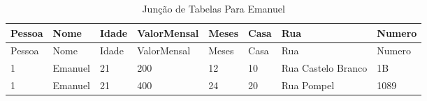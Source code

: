 \begin{longtable}[]{@{}llllllll@{}}
\caption{Junção de Tabelas Para Emanuel \label{tab: juncao-de-tabelas-para-emanuel}}\tabularnewline
\toprule
\footnotesize{Pessoa} & \footnotesize{Nome} & \footnotesize{Idade} & \footnotesize{ValorMensal} & \footnotesize{Meses} & \footnotesize{Casa} & \footnotesize{Rua} & \footnotesize{Numero}\tabularnewline
\midrule
\endfirsthead
\toprule
\footnotesize{Pessoa} & \footnotesize{Nome} & \footnotesize{Idade} & \footnotesize{ValorMensal} & \footnotesize{Meses} & \footnotesize{Casa} & \footnotesize{Rua} & \footnotesize{Numero}\tabularnewline
\midrule
\endhead
\footnotesize{1} & \footnotesize{Emanuel} & \footnotesize{21} & \footnotesize{200} & \footnotesize{12} & \footnotesize{10} & \footnotesize{Rua Castelo Branco} & \footnotesize{1B}\tabularnewline
\footnotesize{1} & \footnotesize{Emanuel} & \footnotesize{21} & \footnotesize{400} & \footnotesize{24} & \footnotesize{20} & \footnotesize{Rua Pompel} & \footnotesize{1089}\tabularnewline
\bottomrule
\end{longtable}

